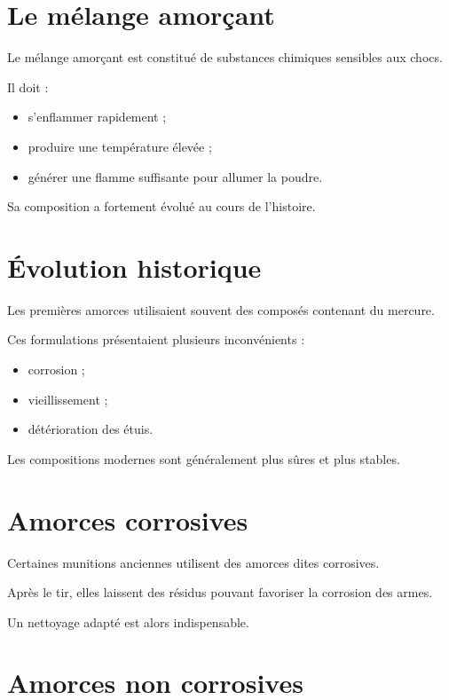 \section{Le mélange amorçant}

Le mélange amorçant est constitué de substances chimiques sensibles aux
chocs.

Il doit :

\begin{itemize}
    \item s'enflammer rapidement ;
    \item produire une température élevée ;
    \item générer une flamme suffisante pour allumer la poudre.
\end{itemize}

Sa composition a fortement évolué au cours de l'histoire.

\section{Évolution historique}

Les premières amorces utilisaient souvent des composés contenant du mercure.

Ces formulations présentaient plusieurs inconvénients :

\begin{itemize}
    \item corrosion ;
    \item vieillissement ;
    \item détérioration des étuis.
\end{itemize}

Les compositions modernes sont généralement plus sûres et plus stables.

\section{Amorces corrosives}

Certaines munitions anciennes utilisent des amorces dites corrosives.

Après le tir, elles laissent des résidus pouvant favoriser la corrosion des
armes.

Un nettoyage adapté est alors indispensable.

\section{Amorces non corrosives}

